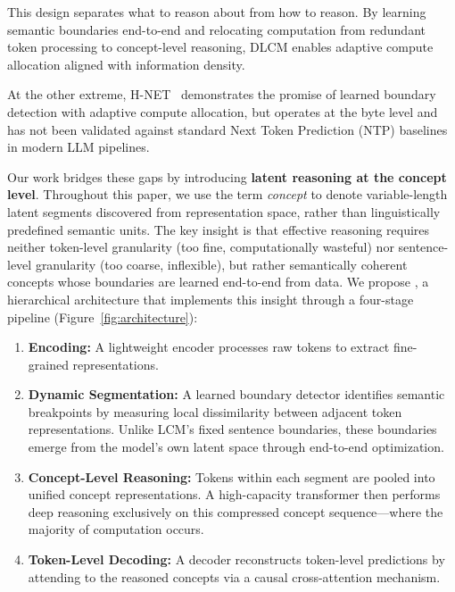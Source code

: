 This design separates what to reason about from how to reason. By learning semantic boundaries end-to-end and relocating computation from redundant token processing to concept-level reasoning, DLCM enables adaptive compute allocation aligned with information density.

At the other extreme, H-NET~\cite{hwang2025dynamicchunkingendtoendhierarchical} demonstrates the promise of learned boundary detection with adaptive compute allocation, but operates at the byte level and has not been validated against standard Next Token Prediction (NTP) baselines in modern LLM pipelines.

Our work bridges these gaps by introducing \textbf{latent reasoning at the concept level}. Throughout this paper, we use the term \emph{concept} to denote variable-length latent segments discovered from representation space, rather than linguistically predefined semantic units.
 The key insight is that effective reasoning requires neither token-level granularity (too fine, computationally wasteful) nor sentence-level granularity (too coarse, inflexible), but rather semantically coherent concepts whose boundaries are learned end-to-end from data. We propose \textbf{\ModelName}, a hierarchical architecture that implements this insight through a four-stage pipeline (Figure~\ref{fig:architecture}):

\begin{enumerate}
\item \textbf{Encoding:} A lightweight encoder processes raw tokens to extract fine-grained representations.

\item \textbf{Dynamic Segmentation:} A learned boundary detector identifies semantic breakpoints by measuring local dissimilarity between adjacent token representations. Unlike LCM's fixed sentence boundaries, these boundaries emerge from the model's own latent space through end-to-end optimization.

\item \textbf{Concept-Level Reasoning:} Tokens within each segment are pooled into unified concept representations. A high-capacity transformer then performs deep reasoning exclusively on this compressed concept sequence---where the majority of computation occurs.

\item \textbf{Token-Level Decoding:} A decoder reconstructs token-level predictions by attending to the reasoned concepts via a causal cross-attention mechanism.
\end{enumerate}

